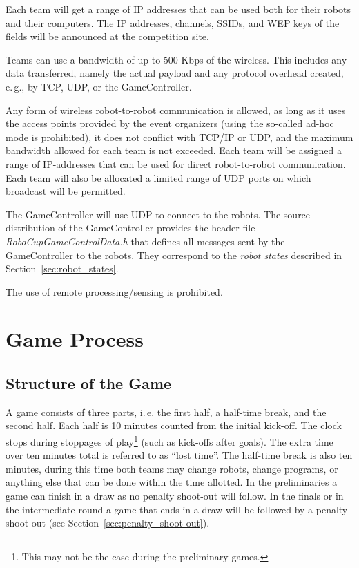 \documentclass[12pt]{article}
\newcommand{\ie}{\mbox{i.\,e.}\xspace}
\newcommand{\eg}{\mbox{e.\,g.}\xspace}
\begin{document}
Each team will get a range of IP addresses that can be used both for their robots and their computers. The IP addresses, channels, SSIDs, and WEP keys of the fields will be announced at the competition site.

Teams can use a bandwidth of up to 500 Kbps of the wireless. This includes any data transferred, namely the actual payload and any protocol overhead created, \eg, by TCP, UDP, or the GameController.

Any form of wireless robot-to-robot communication is allowed, as long as it uses the access points provided by the event organizers (using the so-called ad-hoc mode is prohibited), it does not conflict with TCP/IP or UDP, and the maximum bandwidth allowed for each team is not exceeded. Each team will be assigned a range of IP-addresses that can be used for direct robot-to-robot communication. Each team will also be allocated a limited range of UDP ports on which broadcast will be permitted.

The GameController will use UDP to connect to the robots. The source distribution of the GameController provides the header file \emph{RoboCupGameControlData.h} that defines all messages sent by the GameController to the robots. They correspond to the \emph{robot states} described in Section~\ref{sec:robot_states}.

The use of remote processing/sensing is prohibited.

\section{Game Process}

\subsection{Structure of the Game}
\label{sec:game_struct}

A game consists of three parts, \ie the first half, a half-time break, and the second half. Each half is 10 minutes counted from the initial kick-off. The clock stops during stoppages of play\footnote{This may not be the case during the preliminary games.} (such as kick-offs after goals). The extra time over ten minutes total is referred to as ``lost time''. The half-time break is also ten minutes, during this time both teams may change robots, change programs, or anything else that can be done within the time allotted. In the preliminaries a game can finish in a draw as no penalty shoot-out will follow. In the finals or in the intermediate round a game that ends in a draw will be followed by a penalty shoot-out (see Section~\ref{sec:penalty_shoot-out}).
\end{document}
